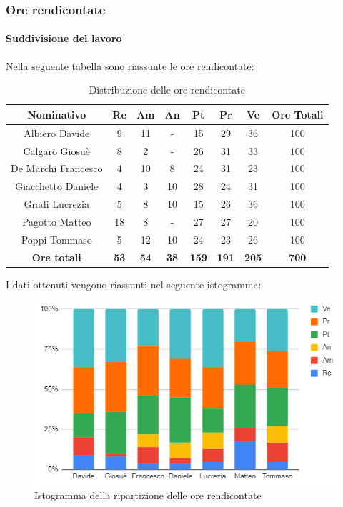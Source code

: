 \subsubsection{Ore rendicontate}
\paragraph{Suddivisione del lavoro}
Nella seguente tabella sono riassunte le ore rendicontate:
\begin{table}[H]
		\begin{center}
			\setlength{\aboverulesep}{0pt}
			\setlength{\belowrulesep}{0pt}
			\setlength{\extrarowheight}{.75ex}
			\begin{tabular}{ c c c c c c c c }
				\rowcolor{AzzurroGruppo!30} 
				\textbf{Nominativo} & \textbf{Re} & \textbf{Am} & \textbf{An} & \textbf{Pt} & \textbf{Pr} & \textbf{Ve} & \textbf{Ore Totali}  \\
				\toprule
				Albiero Davide      & 9  & 11 & -  & 15  & 29 & 36 & 100 \\
				Calgaro Giosuè      & 8  & 2 & -  & 26 & 31 & 33  & 100 \\
				De Marchi Francesco & 4  & 10 & 8  & 24 & 31 & 23  & 100\\
				Giacchetto Daniele  & 4  & 3 & 10 & 28 & 24 & 31  & 100\\
				Gradi Lucrezia      & 5  & 8 & 10 & 15  & 26 & 36 & 100\\
				Pagotto Matteo      & 18 & 8 & -  & 27 & 27 & 20  & 100\\
				Poppi Tommaso       & 5  & 12 & 10 & 24  & 23 & 26  & 100\\
				 \textbf{Ore totali} & \textbf{53} & \textbf{54} & \textbf{38} & \textbf{159} & \textbf{191} & \textbf{205} & \textbf{700} \\
				\bottomrule
			\end{tabular}
			\caption{Distribuzione delle ore rendicontate}
		\end{center}
	\end{table}
	I dati ottenuti vengono riassunti nel seguente istogramma:
\begin{figure}[H]
    \centering
    \includegraphics[scale = 0.5]{components/img/rendiconto_isto.png}
    \caption{ Istogramma della ripartizione delle ore rendicontate}
    \label{fig:logo}
\end{figure}
